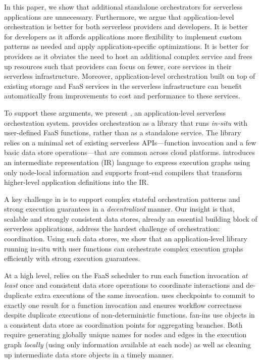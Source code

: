 In this paper, we show that additional standalone orchestrators for serverless
applications are unnecessary. Furthermore, we argue that application-level
orchestration is better for both serverless providers and developers. It is
better for developers as it affords applications more flexibility to implement
custom patterns as needed and apply application-specific optimizations. It is
better for providers as it obviates the need to host an additional complex
service and frees up resources such that providers can focus on fewer, core
services in their serverless infrastructure. Moreover, application-level
orchestration built on top of existing storage and FaaS services in the
serverless infrastructure can benefit automatically from improvements to cost
and performance to these services.

To support these arguments, we present \name{}, an application-level
serverless orchestration system. \name{} provides orchestration as a library
that runs \emph {in-situ} with user-defined FaaS functions, rather than as a
standalone service. The library relies on a minimal set of existing serverless
APIs---function invocation and a few basic data store operations---that are
common across cloud platforms. \name{} introduces an intermediate
representation (IR) language to express execution graphs using only node-local
information and supports front-end compilers that transform higher-level
application definitions into the IR.

A key challenge in \name{} is to support complex stateful orchestration
patterns and strong execution guarantees in a \emph{decentralized} manner. Our
insight is that, scalable and strongly consistent data stores, already an
essential building block of serverless applications, address the hardest
challenge of orchestration: coordination. Using such data stores, we show that
an application-level library running in-situ with user functions can
orchestrate complex execution graphs efficiently with strong execution
guarantees.

At a high level, \name{} relies on the FaaS scheduler to run each function
invocation \emph{at least} once and consistent data store operations to
coordinate interactions and de-duplicate extra executions of the same
invocation. \name{} uses checkpoints to commit to exactly one result for a
function invocation and ensures workflow correctness despite duplicate
executions of non-deterministic functions. \name{} fan-ins use objects in a
consistent data store as coordination points for aggregating branches. Both
require generating globally unique names for nodes and edges in the execution
graph \emph{locally} (using only information available at each node) as well
as cleaning up intermediate data store objects in a timely manner.

